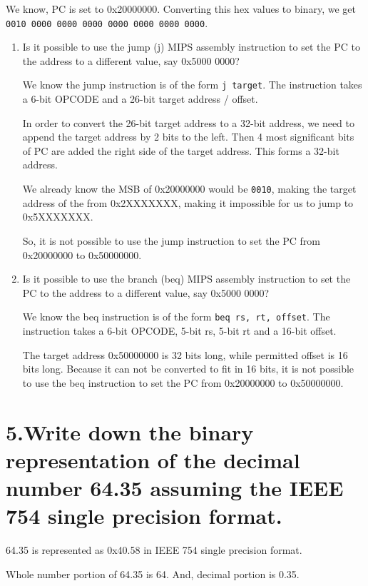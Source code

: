 \documentclass[11pt]{article}
\newenvironment{qparts}{\begin{enumerate}[{(}a{)}]}{\end{enumerate}}
\begin{document}
We know, PC is set to 0x20000000. Converting this hex values to binary, we get \texttt{0010 0000 0000 0000 0000 0000 0000 0000}.
\begin{qparts}
    \item Is it possible to use the jump (j) MIPS assembly instruction to set the PC to the address to a different value, say 0x5000 0000?

    We know the jump instruction is of the form \texttt{j target}.
    The instruction takes a 6-bit OPCODE and a 26-bit target address / offset.

    In order to convert the 26-bit target address to a 32-bit address, we need to append the target address by 2 bits to the left. Then 4 most significant bits of PC are added the right side of the target address. This forms a 32-bit address.

    We already know the MSB of 0x20000000 would be \texttt{0010}, making the target address of the from 0x2XXXXXXX, making it impossible for us to jump to 0x5XXXXXXX.

    So, it is not possible to use the jump instruction to set the PC from 0x20000000 to 0x50000000.

    \item Is it possible to use the branch (beq) MIPS assembly instruction to set the PC to the address to a different value, say 0x5000 0000?
    
    We know the beq instruction is of the form \texttt{beq rs, rt, offset}.
    The instruction takes a 6-bit OPCODE, 5-bit rs, 5-bit rt and a 16-bit offset.

    The target address 0x50000000 is 32 bits long, while permitted offset is 16 bits long. 
    Because it can not be converted to fit in 16 bits, it is not possible to use the beq instruction to set the PC from 0x20000000 to 0x50000000.

\end{qparts}

\newpage
\section*{5.Write down the binary representation of the decimal number 64.35 assuming the IEEE 754 single precision format.}

64.35 is represented as 0x40.58 in IEEE 754 single precision format.

Whole number portion of 64.35 is 64. And, decimal portion is 0.35.\\
\end{document}
